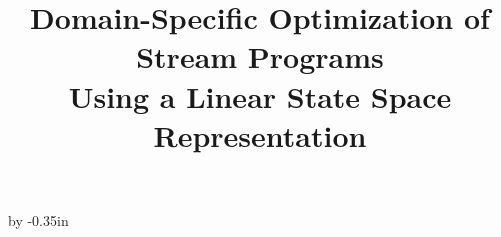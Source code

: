 \documentclass[11pt,twoside]{article}
\title{Domain-Specific Optimization of Stream Programs \\ Using a Linear State Space Representation}
\date{}
\begin{document}
  \newcommand{\subsubsubsection}[1]{\medskip\noindent{\bf #1}\\\smallskip}
  \newcommand{\mt}[1]{\mbox{\it #1}}
  \newcommand{\todo}[1]{\framebox{#1}}

  
  \begin{singlespace}
    \maketitle
    \begin{abstract}
      
    \end{abstract}
  \end{singlespace}
  
  \advance\topmargin by -0.35in      %

  
  
  
  
  
  
  

  \begin{small}
    \begin{singlespace}
      
      
    \end{singlespace}
  \end{small}
  
\end{document}
